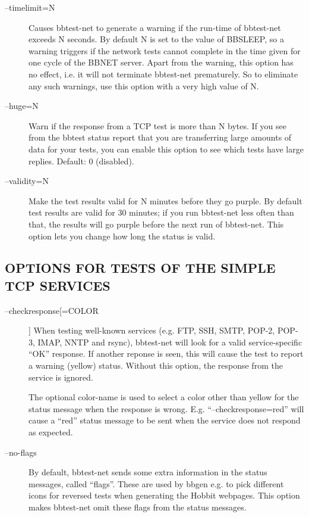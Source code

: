 \begin{description}
 

\item[--timelimit=N] Causes bbtest-net to generate a warning if the
  run-time of bbtest-net exceeds N seconds. By default N is set to the
  value of BBSLEEP, so a warning triggers if the network tests cannot
  complete in the time given for one cycle of the BBNET server. Apart
  from the warning, this option has no effect, i.e. it will not
  terminate bbtest-net prematurely. So to eliminate any such warnings,
  use this option with a very high value of N. 



\item[--huge=N] Warn if the response from a TCP test is more than N
  bytes. If you see from the bbtest status report that you are
  transferring large amounts of data for your tests, you can enable
  this option to see which tests have large replies.   Default: 0
  (disabled). 


 

\item[--validity=N] Make the test results valid for N minutes before
  they go purple. By default test results are valid for 30 minutes; if
  you run bbtest-net less often than that, the results will go purple
  before the next run of bbtest-net. This option lets you change how
  long the status is valid. 


\end{description}

\subsection{OPTIONS FOR TESTS OF THE SIMPLE TCP SERVICES}
\begin{description}
\item[--checkresponse[=COLOR]] When testing well-known services
  (e.g. FTP, SSH, SMTP, POP-2, POP-3, IMAP, NNTP and rsync),
  bbtest-net will look for a valid service-specific ``OK''
  response. If another reponse is seen, this will cause the test to
  report a warning (yellow) status. Without this option, the response
  from the service is ignored.  

 The optional color-name is used to select a color other than yellow
 for the status message when the response is
 wrong. E.g. ``--checkresponse=red'' will cause a ``red'' status
 message to be sent when the service does not respond as expected. 


 

\item[--no-flags] By default, bbtest-net sends some extra information
  in the status messages, called ``flags''. These are used by bbgen
  e.g. to pick different icons for reversed tests when generating the
  Hobbit webpages. This option makes bbtest-net omit these flags from
  the status messages. 



\end{description}

